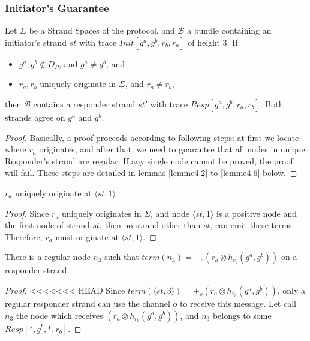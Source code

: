 \begin{itemize}
\subsubsection{Initiator's Guarantee}

\begin{Proposition}
Let $\Sigma$ be a Strand Spaces of the protocol, and $\mathcal{B}$ a bundle containing an initiator's strand $st$ with trace $Init[g^a,g^b,r_b,r_a]$ of height 3. If
 \begin{itemize}
 \item $g^a,g^b \not\in D_P$, and $g^a \not= g^b$, and
 \item $r_a,r_b$ uniquely originate in $\Sigma$, and $r_a \not= r_b$,
 \end{itemize}
then $\mathcal{B}$ contains a responder strand $st'$ with trace $Resp[g^a,g^b,r_a,r_b]$. Both strands agree on $g^a$ and $g^b$.
\end{Proposition}

\begin{proof}
Basically, a proof proceeds according to following steps: at first we locate where $r_a$ originates, and after that, we need to guarantee that all nodes in unique Responder's strand are regular.
 If any single node cannot be proved, the proof will fail. 
These steps are detailed in lemmas \ref{lemme4.2} to \ref{lemme4.6} below.
\end{proof}

\begin{Lemma}\label{lemme4.2}
$r_a$ uniquely originate at $\langle st,1 \rangle$ 
\end{Lemma}

\begin{proof}
Since $r_a$ uniquely originates in $\Sigma$, and node $\langle st,1 \rangle$ is a positive node and the first node of strand $st$, then no strand other than $st$, can emit these terms. Therefore, $r_a$ must originate at $\langle st,1 \rangle$.
\end{proof}

\begin{Lemma}\label{lemme4.3}
There is a regular node $n_3$ such that $term(n_3)= -_o(r_a \otimes h_{r_b}(g^a,g^b))$ on a responder strand. 
\end{Lemma}

\begin{proof}
<<<<<<< HEAD
Since $term(\langle st,3 \rangle) = +_o(r_a \otimes h_{r_b}(g^a,g^b))$, only a regular responder strand can use the channel $o$ to receive this message. Let call $n_3$ the node which receives $(r_a \otimes h_{r_b}(g^a,g^b))$, and $n_3$ belongs to some $Resp[*,g^b,*,r_b]$.
\end{proof}


\end{itemize}
